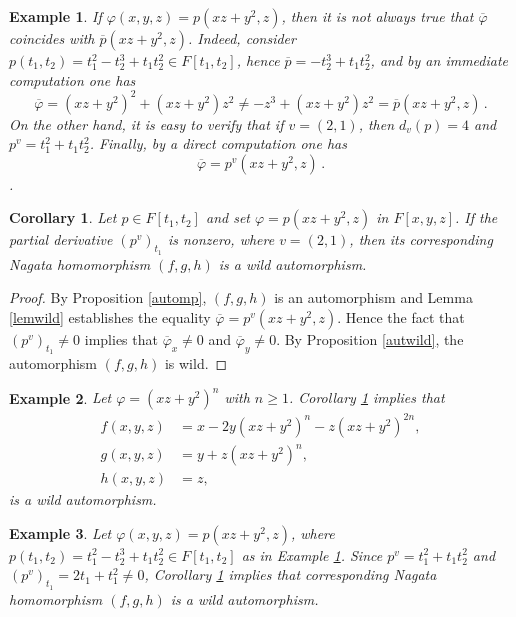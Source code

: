 \documentclass{amsart}
\newtheorem{ex}{Example}
\newtheorem{cor}{Corollary}
\begin{document}
\begin{ex}\label{exww}
	{\em 
		If $\varphi(x,y,z)=p(xz+y^2,z)$, then it is not always true that $\overline{\varphi}$ coincides with $ \overline{p}(xz+y^2,z)$. Indeed, consider $p(t_1,t_2)=t_1^2-t_2^3+t_1t_2^2\in F[t_1,t_2]$, hence $\overline{p}=-t_2^3+t_1t_2^2$, and by an immediate computation one has $$\overline{\varphi}=\left(xz+y^2\right)^2+\left(xz+y^2\right)z^2\neq -z^3+\left(xz+y^2\right)z^2=\overline{p}(xz+y^2,z)\,.$$
		On the other hand, it is easy to verify that if $v=(2,1)$, then $d_v(p)=4$ and $p^v=t_1^2+t_1t_2^2$. Finally, by a direct computation one has
		$$
		\overline{\varphi}=p^v(xz+y^2,z)\,.
		$$.  
	}
\end{ex}

\begin{cor}\label{corwild}
	Let  $p\in F[t_1,t_2]$ and set $\varphi=p(xz+y^2,z)$ in $F[x,y,z]$. %
	If the partial derivative $(p^{v})_{t_1}$ is nonzero, where $v=(2,1)$, then its corresponding Nagata homomorphism $(f,g,h)$ is a wild automorphism. 
	
\end{cor}
\begin{proof}
	By Proposition \ref{automp}, $(f,g,h)$ is an automorphism %
	and Lemma \ref{lemwild} establishes the equality $\overline{\varphi}=p^{v}(xz+y^2,z)$. Hence the fact that $(p^v)_{t_1}\neq 0$ implies that $\overline{\varphi}_x\neq 0$ and $\overline{\varphi}_y\neq 0$. By Proposition  \ref{autwild}, the automorphism $(f,g,h)$ is wild.  
\end{proof}

\begin{ex}
	{\em 
		Let $\varphi=(xz+y^2)^n$ with $n\geq 1$. Corollary \ref{corwild} implies that 
		\begin{align*}
			f(x,y,z)&=x-2y (xz+y^2)^n-z(xz+y^2)^{2n},\\
			g(x,y,z)&=y+z(xz+y^2)^n,\\
			h(x,y,z)&=z,
		\end{align*}
		is a wild automorphism. 
	}
\end{ex}
\begin{ex}
	{\em 
		Let $\varphi(x,y,z)=p(xz+y^2,z)$, where $p(t_1,t_2)=t_1^2-t_2^3+t_1t_2^2\in F[t_1,t_2]$ as in Example \ref{exww}. Since $p^v=t_1^2+t_1t_2^2$ and $(p^v)_{t_1}=2t_1+t_1^2\neq0$, Corollary \ref{corwild} implies that corresponding Nagata homomorphism $(f,g,h)$ is a wild automorphism.
	}
\end{ex}
\end{document}
